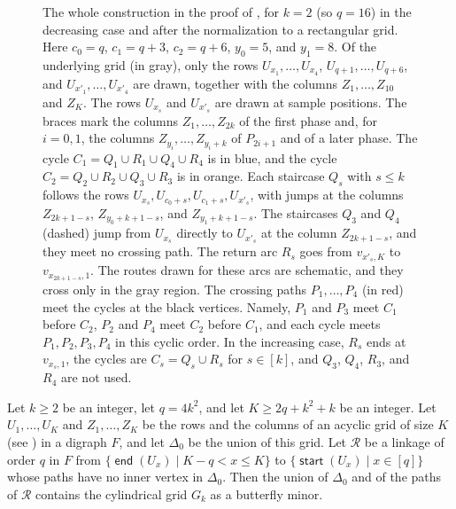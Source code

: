 \documentclass[fontsize=12pt,leading=14pt]{fullpaper}
\DeclareMathOperator{\st}{\mathsf{start}}
\DeclareMathOperator{\en}{\mathsf{end}}
\newcommand{\Rcal}{\mathcal{R}}
\begin{document}
\begin{figure}[htbp]
  \caption{The whole construction in the proof of , for $k=2$ (so $q=16$) in the decreasing case and after the normalization to a rectangular grid.
    Here $c_0=q$, $c_1=q+3$, $c_2=q+6$, $y_0=5$, and $y_1=8$.
    Of the underlying grid (in gray), only the rows $U_{x_1},\dots,U_{x_4}$, $U_{q+1},\dots,U_{q+6}$, and $U_{x'_1},\dots,U_{x'_4}$ are drawn, together with the columns $Z_1,\dots,Z_{10}$ and $Z_K$.
    The rows $U_{x_s}$ and $U_{x'_s}$ are drawn at sample positions.
    The braces mark the columns $Z_1,\dots,Z_{2k}$ of the first phase and, for $i=0,1$, the columns $Z_{y_i},\dots,Z_{y_i+k}$ of $P_{2i+1}$ and of a later phase.
    The cycle $C_1=Q_1\cup R_1\cup Q_4\cup R_4$ is in blue, and the cycle $C_2=Q_2\cup R_2\cup Q_3\cup R_3$ is in orange.
    Each staircase $Q_s$ with $s\le k$ follows the rows $U_{x_s},U_{c_0+s},U_{c_1+s},U_{x'_s}$, with jumps at the columns $Z_{2k+1-s}$, $Z_{y_0+k+1-s}$, and $Z_{y_1+k+1-s}$.
    The staircases $Q_3$ and $Q_4$ (dashed) jump from $U_{x_s}$ directly to $U_{x'_s}$ at the column $Z_{2k+1-s}$, and they meet no crossing path.
    The return arc $R_s$ goes from $v_{x'_s,K}$ to $v_{x_{2k+1-s},1}$.
    The routes drawn for these arcs are schematic, and they cross only in the gray region.
    The crossing paths $P_1,\dots,P_4$ (in red) meet the cycles at the black vertices.
    Namely, $P_1$ and $P_3$ meet $C_1$ before $C_2$, $P_2$ and $P_4$ meet $C_2$ before $C_1$, and each cycle meets $P_1,P_2,P_3,P_4$ in this cyclic order.
  In the increasing case, $R_s$ ends at $v_{x_s,1}$, the cycles are $C_s=Q_s\cup R_s$ for $s\in[k]$, and $Q_3$, $Q_4$, $R_3$, and $R_4$ are not used.}
  \label{fig:s3-cycles}
\end{figure}

\begin{lemma}\label{lem:close-grid}
  Let $k\ge2$ be an integer, let $q=4k^2$, and let $K\ge2q+k^2+k$ be an integer.
  Let $U_1,\dots,U_K$ and $Z_1,\dots,Z_K$ be the rows and the columns of an acyclic grid of size $K$ (see ) in a digraph $F$, and let $\Delta_0$ be the union of this grid.
  Let $\Rcal$ be a linkage of order $q$ in $F$ from $\{\en(U_x)\mid K-q<x\le K\}$ to $\{\st(U_x)\mid x\in[q]\}$ whose paths have no inner vertex in $\Delta_0$.
  Then the union of $\Delta_0$ and of the paths of $\Rcal$ contains the cylindrical grid $G_k$ as a butterfly minor.
\end{lemma}
\end{document}
